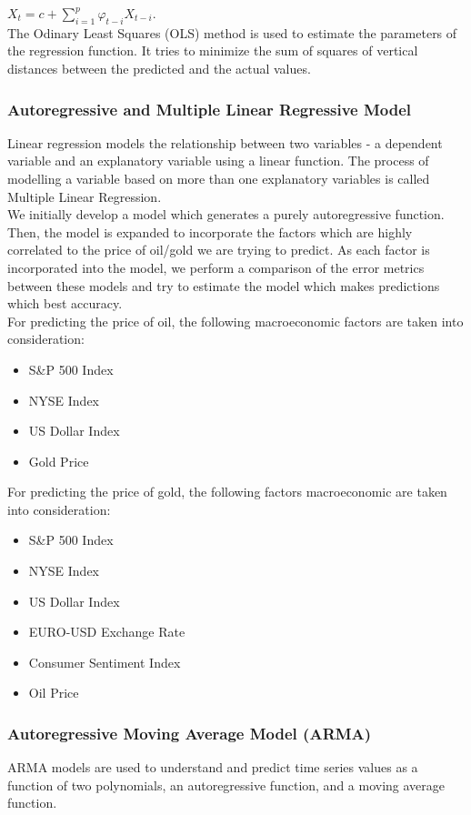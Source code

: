 \documentclass[runningheads]{llncs}
\begin{document}
$ X_{t} = c + \sum\limits_{i=1}^p \varphi_{t-i}X_{t-i}$. \\

\noindent The Odinary Least Squares (OLS) method is used to estimate the parameters of the regression function. It tries to minimize the sum of squares of vertical distances between the predicted and the actual values. 

\subsubsection{Autoregressive and Multiple Linear Regressive Model}
Linear regression models the relationship between two variables - a dependent variable and an explanatory variable using a linear function. The process of modelling a variable based on more than one explanatory variables is called Multiple Linear Regression. \\
   
\noindent We initially develop a model which generates a purely autoregressive function. Then, the model is expanded to incorporate the factors which are highly correlated to the price of oil/gold we are trying to predict. As each factor is incorporated into the model, we perform a comparison of the error metrics between these models and try to estimate the model which makes predictions which best accuracy.\\

For predicting the price of oil, the following macroeconomic factors are taken into consideration:
\begin {itemize}
\item S\&P 500 Index
\item NYSE Index
\item US Dollar Index
\item Gold Price
\end {itemize}

For predicting the price of gold, the following factors macroeconomic are taken into consideration:
\begin {itemize}
\item S\&P 500 Index
\item NYSE Index
\item US Dollar Index
\item EURO-USD Exchange Rate
\item Consumer Sentiment Index
\item Oil Price
\end {itemize}


\subsubsection{Autoregressive Moving Average Model (ARMA)}
ARMA models are used to understand and predict time series values as a function of two polynomials, an autoregressive function, and a moving average function. 
\\
\end{document}
